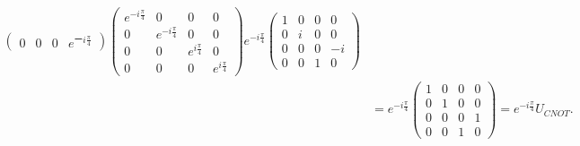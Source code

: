 \begin{ex}
\begin{align*}
\begin{pmatrix}
            0                  & 0                   & 0                  & e^{ーi\frac{\pi}{4}}
        \end{pmatrix}
        \begin{pmatrix}
            e^{-i\frac{\pi}{4}} & 0                   & 0                  & 0                  \\
            0                   & e^{-i\frac{\pi}{4}} & 0                  & 0                  \\
            0                   & 0                   & e^{i\frac{\pi}{4}} & 0                  \\
            0                   & 0                   & 0                  & e^{i\frac{\pi}{4}}
        \end{pmatrix}
        e^{-i \frac{\pi}{4}}
        \begin{pmatrix}
            1 & 0 & 0 & 0  \\
            0 & i & 0 & 0  \\
            0 & 0 & 0 & -i \\
            0 & 0 & 1 & 0
        \end{pmatrix}
        \\
         & =
        e^{-i\frac{\pi}{4}}
        \begin{pmatrix}
            1 & 0 & 0 & 0 \\
            0 & 1 & 0 & 0 \\
            0 & 0 & 0 & 1 \\
            0 & 0 & 1 & 0
        \end{pmatrix}
        =
        e^{-i\frac{\pi}{4}}U_{CNOT}.
    \end{align*}
\end{ex}


